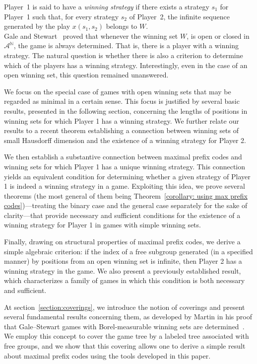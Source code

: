 \documentclass[a4,12pt]{article}%
\newcommand{\N}{\mathbb{N}}
\begin{document}
Player~1 is said to have a \emph{winning strategy} if there exists a strategy $s_1$ for Player~1 such that, for every strategy $s_2$ of Player~2, the infinite sequence generated by the play $x(s_1,s_2)$ belongs to $W$.
\\

Gale and Stewart~\cite{GaleStewartOpenDET} proved that whenever the winning set $W$, is open or closed in $\mathcal{A}^{\N}$, the game is always determined. 
That is, there is a player with a winning strategy. The natural question is whether there is also a criterion to determine which of the players has a winning strategy. 
Interestingly, even in the case of an open winning set, this question remained unanswered.

We focus on the special case of games with open winning sets that may be regarded as minimal in a certain sense. This focus is justified by several basic results, presented in the following section, concerning the lengths of positions in winning sets for which Player 1 has a winning strategy. We further relate our results to a recent theorem establishing a connection between winning sets of small Hausdorff dimension and the existence of a winning strategy for Player 2.

We then establish a substantive connection between maximal prefix codes and winning sets for which Player 1 has a unique winning strategy. This connection yields an equivalent condition for determining whether a given strategy of Player 1 is indeed a winning strategy in a game. Exploiting this idea, we prove several theorems (the most general of them being Theorem~\ref{corollary: using max prefix codes})—treating the binary case and the general case separately for the sake of clarity—that provide necessary and sufficient conditions for the existence of a winning strategy for Player 1 in games with simple winning sets.

Finally, drawing on structural properties of maximal prefix codes, we derive a simple algebraic criterion: if the index of a free subgroup generated (in a specified manner) by positions from an open winning set is infinite, then Player 2 has a winning strategy in the game. We also present a previously established result, which characterizes a family of games in which this condition is both necessary and sufficient.

At section~\ref{section:coverings}, we introduce the notion of coverings and present several fundamental results concerning them, as developed by Martin in his proof that Gale–Stewart games with Borel-measurable winning sets are determined~\cite{MartinCovering}. We employ this concept to cover the game tree by a labeled tree associated with free groups, and we show that this covering allows one to derive a simple result about maximal prefix codes using the tools developed in this paper.
\end{document}
